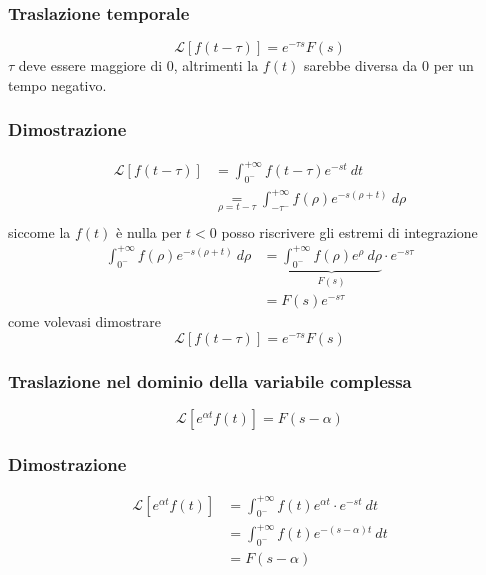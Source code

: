 \documentclass{article}
\numberwithin{equation}{subsection}
\begin{document}
\subsubsection{Traslazione temporale}
\begin{equation}
    \mathcal{L}[f(t-\tau)] = e^{-\tau s}F(s) \tag*{$\forall \tau >0$}
\end{equation}
$\tau$ deve essere maggiore di 0, altrimenti la $f(t)$ sarebbe diversa da 0 per un tempo negativo.

\subsubsection*{Dimostrazione}
\begin{align*}
    \mathcal{L}[f(t-\tau)] &= \int_{0^-}^{+ \infty} f(t - \tau)e^{-st} \ dt\\
    &\underset{\rho = t-\tau}{=} \int_{-\tau^-}^{+ \infty} f(\rho)e^{-s(\rho+t)} \ d\rho\\
\end{align*}
siccome la $f(t)$ è nulla per $t<0$ posso riscrivere gli estremi di integrazione
\begin{align*}
    \int_{0^-}^{+ \infty} f(\rho)e^{-s(\rho+t)} \ d\rho
    &= \underbrace{\int_{0^-}^{+ \infty} f(\rho)e^{\rho} \ d\rho}_{F(s)} \cdot e^{-s\tau} \\
    &= F(s) e^{-s\tau}
\end{align*}
come volevasi dimostrare
\begin{equation}
    \mathcal{L}[f(t-\tau)] = e^{-\tau s}F(s)
\end{equation}

\subsubsection{Traslazione nel dominio della variabile complessa}\label{Traslazione nel dominio della variabile complessa}
\begin{equation}
    \mathcal{L}[e^{\alpha t }f(t)] = F(s - 
    \alpha)
\end{equation}

\subsubsection*{Dimostrazione}
\begin{align*}
    \mathcal{L}[e^{\alpha t }f(t)] &= \int_{0^-}^{+ \infty} f(t)e^{\alpha t} \cdot e^{-st} \ dt \\
    &= \int_{0^-}^{+ \infty} f(t)e^{-(s-\alpha)t} \ dt\\
    &= F(s-\alpha)
\end{align*}
\end{document}
